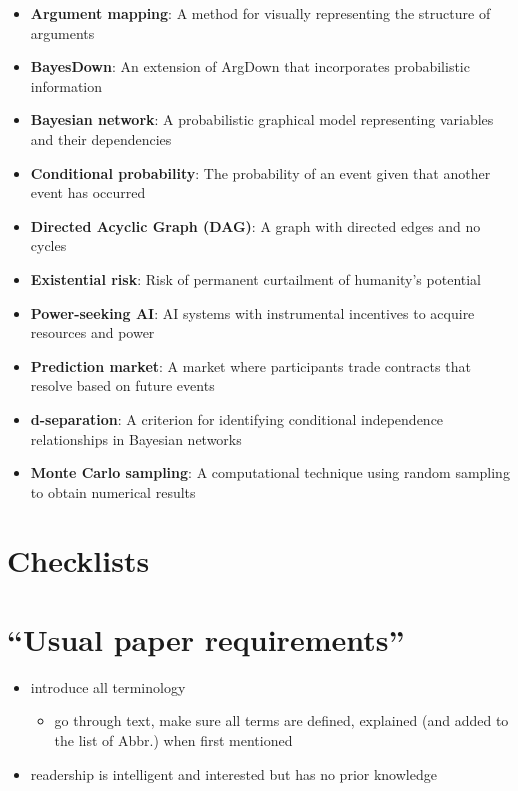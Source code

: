 \documentclass[
  11pt,
  letterpaper,
]{book}
\providecommand{\tightlist}{%
  \setlength{\itemsep}{0pt}\setlength{\parskip}{0pt}}
\begin{document}
\begin{itemize}
\tightlist
\item
  \textbf{Argument mapping}: A method for visually representing the
  structure of arguments\\
\item
  \textbf{BayesDown}: An extension of ArgDown that incorporates
  probabilistic information\\
\item
  \textbf{Bayesian network}: A probabilistic graphical model
  representing variables and their dependencies\\
\item
  \textbf{Conditional probability}: The probability of an event given
  that another event has occurred\\
\item
  \textbf{Directed Acyclic Graph (DAG)}: A graph with directed edges and
  no cycles\\
\item
  \textbf{Existential risk}: Risk of permanent curtailment of humanity's
  potential\\
\item
  \textbf{Power-seeking AI}: AI systems with instrumental incentives to
  acquire resources and power\\
\item
  \textbf{Prediction market}: A market where participants trade
  contracts that resolve based on future events\\
\item
  \textbf{d-separation}: A criterion for identifying conditional
  independence relationships in Bayesian networks\\
\item
  \textbf{Monte Carlo sampling}: A computational technique using random
  sampling to obtain numerical results
\end{itemize}

\section{\texorpdfstring{Checklists }{Checklists }}\label{checklists}

\section{``Usual paper requirements''}\label{usual-paper-requirements}

\begin{itemize}
\tightlist
\item
  introduce all terminology

  \begin{itemize}
  \tightlist
  \item
    go through text, make sure all terms are defined, explained (and
    added to the list of Abbr.) when first mentioned\\
  \end{itemize}
\item
  readership is intelligent and interested but has no prior knowledge
\end{itemize}
\end{document}
